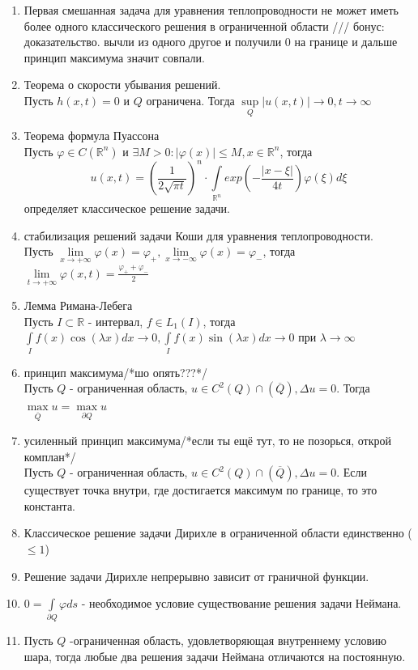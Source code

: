\documentclass[a4paper,12pt]{article}
\newcommand {\pp} {\partial}
\newcommand {\FI} {\varphi}
\newcommand {\iii} {\int\limits}
\begin{document}
\begin{enumerate}
\item Первая смешанная задача для уравнения теплопроводности не может иметь более одного классического решения в ограниченной области /// бонус: доказательство. вычли из одного другое и получили 0 на границе и дальше принцип максимума значит совпали.
\item Теорема о скорости убывания решений.\\
Пусть $h(x,t)=0$ и $Q$ ограничена. Тогда $\sup\limits_Q|u(x,t)|\to 0, t\to\infty$
\item Теорема формула Пуассона\\
Пусть $\FI\in C(\mathbb{R}^n)$ и $\exists M>0: |\FI(x)| \le M, x\in \mathbb{R}^n$, тогда
$$u(x,t) = \left(\frac{1}{2\sqrt{\pi t}}\right)^n \cdot \iii_{\mathbb{R}^n}exp\left(-\frac{|x-\xi|}{4t}\right) \FI(\xi)d\xi$$
определяет классическое решение задачи.
\item стабилизация решений задачи Коши для уравнения теплопроводности.\\
Пусть $\lim\limits_{x\to+\infty} \FI(x)= \FI_+, \lim\limits_{x\to-\infty} \FI(x)= \FI_-$, тогда $\lim\limits_{t\to+\infty} \FI(x,t)= \frac{\FI_+ + \FI_-}{2}$
\item Лемма Римана-Лебега\\
Пусть $I\subset \mathbb{R}$ - интервал, $f\in L_1(I)$, тогда $\iii_If(x)\cos(\lambda x)dx\to0, \iii_If(x)\sin(\lambda x)dx\to0$ при $\lambda\to\infty$


\item принцип максимума/*шо опять???*/\\
Пусть $Q$ - ограниченная область, $u\in C^2(Q)\cap (\overline{Q}), \Delta u=0$. Тогда $\max\limits_{\overline{Q}}u=\max\limits_{\pp Q}u$
\item усиленный принцип максимума/*если ты ещё тут, то не позорься, открой комплан*/\\
Пусть $Q$ - ограниченная область, $u\in C^2(Q)\cap (\overline{Q}), \Delta u=0$. Если существует точка внутри, где достигается максимум по границе, то это константа.


\item Классическое решение задачи Дирихле в ограниченной области единственно ($\le 1$)
\item Решение задачи Дирихле непрерывно зависит  от граничной функции.

\item $0=\iii_{\pp Q} \FI ds$ - необходимое условие существование решения задачи Неймана.

\item Пусть $Q$ -ограниченная область, удовлетворяющая внутреннему условию шара, тогда любые два решения задачи Неймана отличаются на постоянную.


\end{enumerate}
\end{document}
